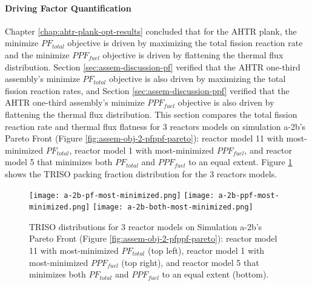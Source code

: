 \paragraph{Driving Factor Quantification}
Chapter \ref{chap:ahtr-plank-opt-results} concluded that for the \gls{AHTR} plank, the 
minimize $PF_{total}$ objective is driven by maximizing the total fission reaction rate 
and the minimize $PPF_{fuel}$ objective is driven by flattening the thermal flux
distribution. 
Section \ref{sec:assem-discussion-pf} verified that the \gls{AHTR} one-third assembly's 
minimize $PF_{total}$ objective is also driven by maximizing the total fission reaction 
rates, and Section \ref{sec:assem-discussion-ppf} verified that the \gls{AHTR}
one-third assembly's minimize $PPF_{fuel}$ objective is also driven by flattening the 
thermal flux distribution. 
This section compares the total fission reaction rate and thermal flux flatness for 
3 reactors models on simulation a-2b's Pareto Front (Figure 
\ref{fig:assem-obj-2-pfppf-pareto}): reactor model 11 with most-minimized $PF_{total}$, 
reactor model 1 with most-minimized $PPF_{fuel}$, and reactor model 5 that minimizes 
both $PF_{total}$ and $PPF_{fuel}$ to an equal extent.
Figure \ref{fig:a-2b-comparison-reactors} shows the TRISO packing fraction distribution 
for the 3 reactors models.
\begin{figure}[htbp!]
    \centering
    \texttt{[image: a-2b-pf-most-minimized.png]} 
    \texttt{[image: a-2b-ppf-most-minimized.png]} 
    \texttt{[image: a-2b-both-most-minimized.png]} 
    \caption{TRISO distributions for 3 reactor models on Simulation a-2b's Pareto Front 
    (Figure \ref{fig:assem-obj-2-pfppf-pareto}): reactor model 11 with most-minimized 
    $PF_{total}$ (top left), reactor model 1 with most-minimized $PPF_{fuel}$ (top right), 
    and reactor model 5 that minimizes both $PF_{total}$ and $PPF_{fuel}$ to an equal 
    extent (bottom).}
    \label{fig:a-2b-comparison-reactors}
\end{figure}

